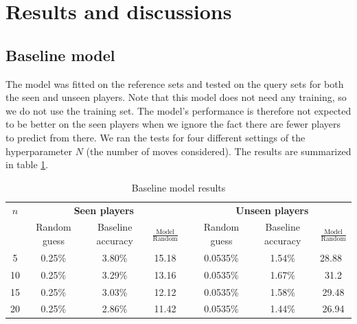 \section{Results and discussions}

\subsection{Baseline model}
The model was fitted on the reference sets and tested on the query sets for both the seen and unseen players.
Note that this model does not need any training, so we do not use the training set. The model's performance is therefore not expected to be better on the seen players when we ignore the fact there are fewer players to predict from there.
We ran the tests for four different settings of the hyperparameter $N$ (the number of moves considered). 
The results are summarized in table \ref{tab:Baseline_model}.

\begin{table}[h]
    \centering
    \caption{Baseline model results}
    \begin{tabular}{cccccccc}
        \toprule
        $n$ & \multicolumn{3}{c}{\textbf{Seen players}} & & \multicolumn{3}{c}{\textbf{Unseen players}} \\
        & Random guess & Baseline accuracy & $\frac{\text{Model}}{\text{Random}}$ & &  Random guess & Baseline accuracy & $\frac{\text{Model}}{\text{Random}}$ \\
        \midrule
        5 & 0.25\% & 3.80\% & 15.18 & & 0.0535\% & 1.54\% & 28.88\ \\
        10  & 0.25\% & 3.29\% & 13.16 & & 0.0535\% & 1.67\% & 31.2 \\
        15  & 0.25\% & 3.03\% & 12.12 & & 0.0535\%& 1.58\% & 29.48 \\
        20  & 0.25\% & 2.86\% & 11.42 & & 0.0535\% & 1.44\% & 26.94 \\
         \bottomrule
    \end{tabular}
    \label{tab:Baseline_model}
\end{table}




